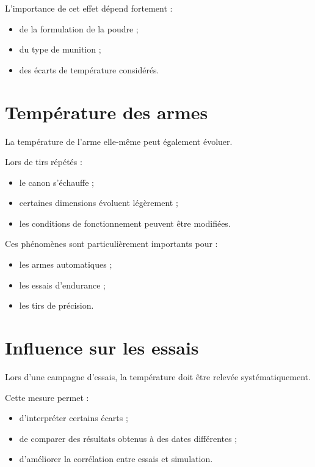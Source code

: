 L'importance de cet effet dépend fortement :

\begin{itemize}
\item de la formulation de la poudre ;
\item du type de munition ;
\item des écarts de température considérés.
\end{itemize}

\section{Température des armes}

La température de l'arme elle-même peut également évoluer.

Lors de tirs répétés :

\begin{itemize}
\item le canon s'échauffe ;
\item certaines dimensions évoluent légèrement ;
\item les conditions de fonctionnement peuvent être modifiées.
\end{itemize}

Ces phénomènes sont particulièrement importants pour :

\begin{itemize}
\item les armes automatiques ;
\item les essais d'endurance ;
\item les tirs de précision.
\end{itemize}

\section{Influence sur les essais}

Lors d'une campagne d'essais, la température doit être relevée
systématiquement.

Cette mesure permet :

\begin{itemize}
\item d'interpréter certains écarts ;
\item de comparer des résultats obtenus à des dates différentes ;
\item d'améliorer la corrélation entre essais et simulation.
\end{itemize}

